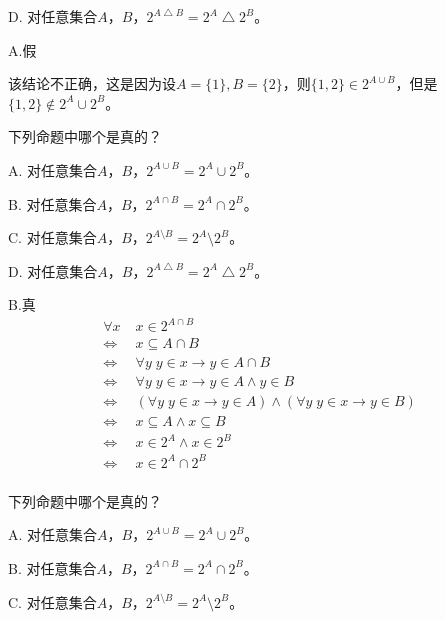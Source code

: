 \documentclass{beamer}
\begin{document}
\begin{CJK*}{UTF8}{gbsn}
\begin{frame}
\begin{Exercise}
D. 对任意集合$A$，$B$，$2^{A\bigtriangleup B} = 2^A \bigtriangleup 2^B$。

\end{Exercise}
\pause
A.假

该结论不正确，这是因为设$A=\{1\},B=\{2\}$，则$\{1,2\}\in 2^{A\cup B}$，但是$\{1,2\}\notin 2^{A}\cup 2^{B}$。
\end{frame}

\begin{frame}
\begin{Exercise}
  下列命题中哪个是真的？

A. 对任意集合$A$，$B$，$2^{A\cup B} = 2^A \cup 2^B$。


B. 对任意集合$A$，$B$，$2^{A\cap B} = 2^A \cap 2^B$。

C. 对任意集合$A$，$B$，$2^{A\setminus B} = 2^A \setminus 2^B$。

D. 对任意集合$A$，$B$，$2^{A\bigtriangleup B} = 2^A \bigtriangleup 2^B$。

\end{Exercise}
\pause
B.真
\pause
  \begin{equation*}
    \begin{split}
      \forall x \;&x \in 2^{A\cap B}\\
    \Leftrightarrow&x \subseteq A \cap B\\      
    \Leftrightarrow&\forall y\; y \in x \to y \in A \cap B\\
    \Leftrightarrow&\forall y\; y \in x \to y \in A \land y \in B\\
    \Leftrightarrow&(\forall y\; y \in x \to y \in A) \land (\forall y\; y \in x \to y \in B)\\
    \Leftrightarrow&x \subseteq A \land x \subseteq B\\
    \Leftrightarrow&x \in 2^A \land x \in 2^B\\
    \Leftrightarrow&x \in 2^A \cap 2^B\\    
    \end{split}
  \end{equation*}

\end{frame}
\begin{frame}
\begin{Exercise}
  下列命题中哪个是真的？

A. 对任意集合$A$，$B$，$2^{A\cup B} = 2^A \cup 2^B$。

B. 对任意集合$A$，$B$，$2^{A\cap B} = 2^A \cap 2^B$。

C. 对任意集合$A$，$B$，$2^{A\setminus B} = 2^A \setminus 2^B$。


\end{Exercise}
\end{frame}
\end{CJK*}
\end{document}
